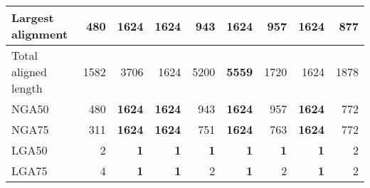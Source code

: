 \documentclass[12pt,a4paper]{article}
\begin{document}
\begin{table}[ht]
\begin{center}
\begin{tabular}{|l*{8}{|r}|}
Largest alignment & 480 & {\bf 1624} & {\bf 1624} & 943 & {\bf 1624} & 957 & {\bf 1624} & 877 \\ \hline
Total aligned length & 1582 & 3706 & 1624 & 5200 & {\bf 5559} & 1720 & 1624 & 1878 \\ \hline
NGA50 & 480 & {\bf 1624} & {\bf 1624} & 943 & {\bf 1624} & 957 & {\bf 1624} & 772 \\ \hline
NGA75 & 311 & {\bf 1624} & {\bf 1624} & 751 & {\bf 1624} & 763 & {\bf 1624} & 772 \\ \hline
LGA50 & 2 & {\bf 1} & {\bf 1} & {\bf 1} & {\bf 1} & {\bf 1} & {\bf 1} & 2 \\ \hline
LGA75 & 4 & {\bf 1} & {\bf 1} & 2 & {\bf 1} & 2 & {\bf 1} & 2 \\ \hline
\end{tabular}
\end{center}
\end{table}
\end{document}
